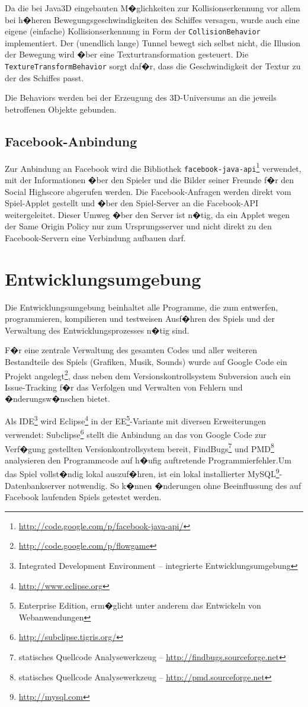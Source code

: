 \documentclass[a4paper,12pt]{scrartcl}
\newcommand*{\code}[1]{\texttt{#1}}%
\begin{document}
Da die bei Java3D eingebauten M�glichkeiten zur Kollisionserkennung vor allem bei
h�heren Bewegungsgeschwindigkeiten des Schiffes versagen, wurde auch eine eigene
(einfache) Kollisionserkennung in Form der \texttt{CollisionBehavior}
implementiert. Der (unendlich lange) Tunnel bewegt sich selbst nicht, die Illusion der Bewegung wird �ber eine
Texturtransformation gesteuert. Die \texttt{TextureTransformBehavior} sorgt
daf�r, dass die Geschwindigkeit der Textur zu der des Schiffes passt.

Die Behaviors werden bei der Erzeugung des 3D-Universums an die jeweils
betroffenen Objekte gebunden.

\subsection{Facebook-Anbindung}
Zur Anbindung an Facebook wird die Bibliothek \code{facebook-java-api}\footnote{\url{http://code.google.com/p/facebook-java-api/}} verwendet, mit der Informationen �ber den Spieler und die Bilder seiner Freunde f�r den Social High\-score abgerufen werden. Die Facebook-Anfragen werden direkt vom Spiel-Applet gestellt und �ber den Spiel-Server an die Facebook-API weitergeleitet. Dieser Umweg �ber den Server ist n�tig, da ein Applet wegen der Same Origin Policy nur zum Ursprungsserver und nicht direkt zu den Facebook-Servern eine Verbindung aufbauen darf.

\section{Entwicklungsumgebung}
Die Entwicklungsumgebung beinhaltet alle Programme, die zum entwerfen,
programmieren, kompilieren und testweisen Ausf�hren des Spiels und der Verwaltung des
Entwicklungsprozesses n�tig sind.

F�r eine zentrale Verwaltung des gesamten Codes und aller weiteren Bestandteile des
Spiels (Grafiken, Musik, Sounds) wurde auf Google Code ein Projekt angelegt\footnote{\url{http://code.google.com/p/flowgame}}, dass neben dem Versionskontrollsystem Subversion auch ein Issue-Tracking f�r das Verfolgen und Verwalten von Fehlern und �nderungsw�nschen bietet.

Als IDE\footnote{Integrated Development Environment -- integrierte
Entwicklungsumgebung} wird Eclipse\footnote{\url{http://www.eclipse.org}} in der EE\footnote{Enterprise Edition,
erm�glicht unter anderem das Entwickeln von Webanwendungen}-Variante mit
diversen Erweiterungen verwendet:
Subclipse\footnote{\url{http://subclipse.tigris.org/}} stellt die Anbindung an
das von Google Code zur Verf�gung gestellten
Versionkontrollsystem bereit, FindBugs\footnote{statisches Quellcode Analysewerkzeug -- \url{http://findbugs.sourceforge.net}} und PMD\footnote{statisches Quellcode Analysewerkzeug -- \url{http://pmd.sourceforge.net}} analysieren den Programmcode auf h�ufig auftretende
Programmierfehler.\newline Um das Spiel vollst�ndig lokal auszuf�hren, ist ein
lokal installierter MySQL\footnote{\url{http://mysql.com}}-Daten\-bankserver notwendig. So k�nnen �nderungen ohne Beeinflussung des auf Facebook laufenden Spiels getestet werden.
\end{document}
